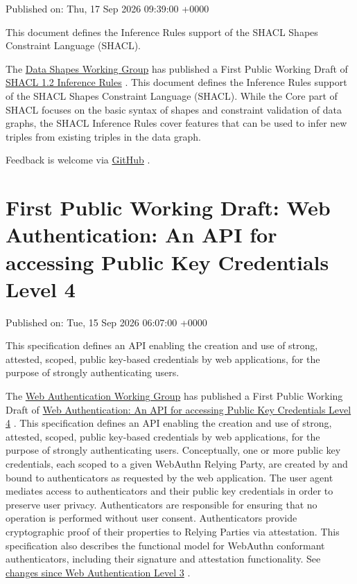 \documentclass[11pt,a4paper]{article}
\begin{document}
Published on: Thu, 17 Sep 2026 09:39:00 +0000

This document defines the Inference Rules support of the SHACL Shapes Constraint Language (SHACL).

The \href{https://www.w3.org/groups/wg/data-shapes}{Data Shapes Working Group} has published a First Public Working Draft of \href{https://www.w3.org/TR/2026/WD-shacl12-inference-rules-20260917/}{SHACL 1.2 Inference Rules} . This document defines the Inference Rules support of the SHACL Shapes Constraint Language (SHACL). While the Core part of SHACL focuses on the basic syntax of shapes and constraint validation of data graphs, the SHACL Inference Rules cover features that can be used to infer new triples from existing triples in the data graph.

Feedback is welcome via \href{https://github.com/w3c/data-shapes/}{GitHub} .

\section{First Public Working Draft: Web Authentication: An API for accessing Public Key Credentials Level 4}

Published on: Tue, 15 Sep 2026 06:07:00 +0000

This specification defines an API enabling the creation and use of strong, attested, scoped, public key-based credentials by web applications, for the purpose of strongly authenticating users.

The \href{https://www.w3.org/groups/wg/webauthn/}{Web Authentication Working Group} has published a First Public Working Draft of \href{https://www.w3.org/TR/2026/WD-webauthn-4-20260915/}{Web Authentication: An API for accessing Public Key Credentials Level 4} . This specification defines an API enabling the creation and use of strong, attested, scoped, public key-based credentials by web applications, for the purpose of strongly authenticating users. Conceptually, one or more public key credentials, each scoped to a given WebAuthn Relying Party, are created by and bound to authenticators as requested by the web application. The user agent mediates access to authenticators and their public key credentials in order to preserve user privacy. Authenticators are responsible for ensuring that no operation is performed without user consent. Authenticators provide cryptographic proof of their properties to Relying Parties via attestation. This specification also describes the functional model for WebAuthn conformant authenticators, including their signature and attestation functionality. See \href{https://www.w3.org/TR/2026/WD-webauthn-4-20260915/\#changes-since-l3}{changes since Web Authentication Level 3} .
\end{document}
